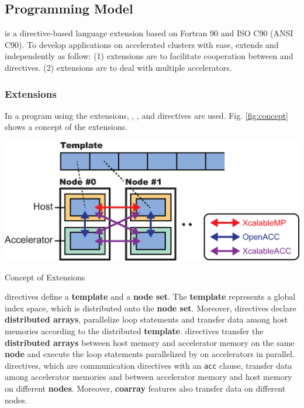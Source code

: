 \subsection{Programming Model}
{\XACC} is a directive-based language extension based on Fortran 90 and ISO C90 (ANSI C90).
To develop applications on accelerated clusters with ease,
{\XACC} extends {\XMP} and {\OACC} independently as follow:
(1) {\XMP} extensions are to facilitate cooperation between {\XMP} and {\OACC} directives.
(2) {\OACC} extensions are to deal with multiple accelerators.

\subsubsection{{\XMP} Extensions}
In a program using the {\XMP} extensions,
{\XMP}, {\OACC}, and {\XACC} directives are used.
Fig. \ref{fig:concept} shows a concept of the {\XMP} extensions.

\begin{myfigure}
\includegraphics[width=\textwidth]{figs/concept.eps}
  \caption{Concept of {\XMP} Extensions}\label{fig:concept}
\end{myfigure}

{\XMP} directives define a {\bf template} and a {\bf node set}.
The {\bf template} represents a global index space, which is distributed onto the {\bf node set}.
Moreover, {\XMP} directives declare {\bf distributed arrays},
parallelize loop statements and transfer data among host memories according to the distributed {\bf template}.
{\OACC} directives transfer the {\bf distributed arrays} between host memory and accelerator memory on the same {\bf node}
and execute the loop statements parallelized by {\XMP} on accelerators in parallel.
{\XACC} directives, which are {\XMP} communication directives with an {\tt acc} clause, 
transfer data among accelerator memories and between accelerator memory and host memory on different {\bf nodes}.
Moreover, 
{\bf coarray} features also transfer data on different nodes.

